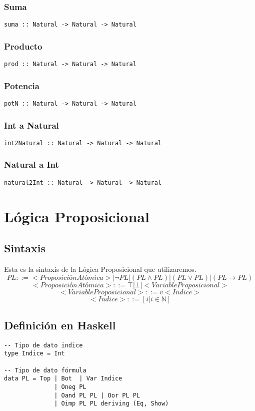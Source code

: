 \documentclass[11pt]{article}
\begin{document}
\subsubsection{Suma}
\label{sec:org1587898}
\begin{verbatim}
suma :: Natural -> Natural -> Natural
\end{verbatim}
\subsubsection{Producto}
\label{sec:org9904d74}
\begin{verbatim}
prod :: Natural -> Natural -> Natural
\end{verbatim}
\subsubsection{Potencia}
\label{sec:org7add382}
\begin{verbatim}
potN :: Natural -> Natural -> Natural
\end{verbatim}
\subsubsection{Int a Natural}
\label{sec:org658a4f3}
\begin{verbatim}
int2Natural :: Natural -> Natural -> Natural
\end{verbatim}
\subsubsection{Natural a Int}
\label{sec:org2257adc}
\begin{verbatim}
natural2Int :: Natural -> Natural -> Natural
\end{verbatim}
\section{Lógica Proposicional}
\label{sec:orgddf4ce4}
\subsection{Sintaxis}
\label{sec:org8615a0e}
Esta es la sintaxis de la Lógica Proposicional que utilizaremos. 
\[PL ::= <ProposiciónAtómica> | \neg PL | (PL \land PL) | (PL \lor PL) | (PL \to PL) \]
\[<ProposiciónAtómica> ::= \top | \bot | <VariableProposicional>\]
\[<VariableProposicional> ::= v<Indice>\]
\[ <Indice> ::= [i | i \in \mathbb{N}]\]

\subsection{Definición en Haskell}
\label{sec:orga7844d5}
\begin{verbatim}
-- Tipo de dato indice
type Indice = Int

-- Tipo de dato fórmula
data PL = Top | Bot  | Var Indice
              | Oneg PL 
              | Oand PL PL | Oor PL PL 
              | Oimp PL PL deriving (Eq, Show)
\end{verbatim}
\end{document}
